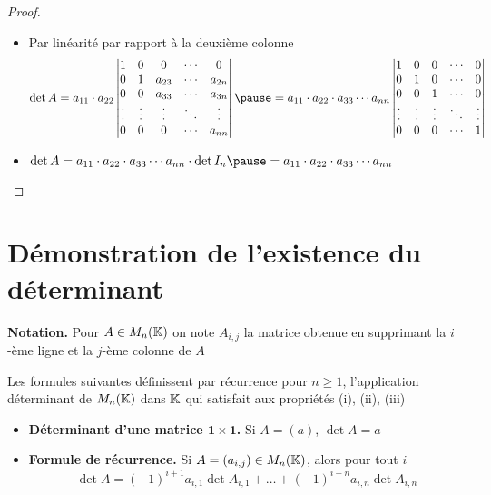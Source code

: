 \begin{frame}
\begin{proof}
\begin{itemize}
  \item Par linéarité par rapport à la deuxième colonne 
\[
\det A =a_{11} \cdot a_{22}\left|\begin{matrix}
1&0&0&\cdots&0\\
0&1&a_{23}&\cdots&a_{2n}\\
0&0&{a_{33}}&\cdots&a_{3n}\\
\vdots&\vdots&\vdots&\ddots&\vdots\\
0&0&0&\cdots&{a_{nn}}
\end{matrix}\right|
\pause=a_{11} \cdot a_{22} \cdot a_{33}\cdots{a_{nn}}\left|\begin{matrix}
1&0&0&\cdots&0\\
0&1&0&\cdots&0\\
0&0&1&\cdots&0\\
\vdots&\vdots&\vdots&\ddots&\vdots\\
0&0&0&\cdots&1
\end{matrix}\right| 
\]

  \item\pause  $\det A = a_{11} \cdot a_{22} \cdot a_{33}\cdots{a_{nn}} \cdot \det I_n \pause = a_{11} \cdot a_{22} \cdot a_{33}\cdots{a_{nn}}$

\end{itemize}
\end{proof} 
\end{frame}



\section{Démonstration de l'existence du déterminant}

\begin{frame}


\textbf{Notation.}
Pour $A \in M_n(\mathbb{K})$ \pause on note $A_{i,j}$ la matrice obtenue en supprimant la $i$-ème ligne et la $j$-ème colonne de $A$ 
 \pause

\begin{theoreme}
Les formules suivantes définissent par récurrence pour $n\ge 1$, l'application déterminant
de $M_n(\mathbb{K})$ dans $\mathbb{K}$ qui satisfait aux propriétés (i), (ii), (iii)
\smallskip

\begin{itemize}
  \item \pause \textbf{Déterminant d'une matrice $\mathbf{1\times 1}$.} 
  Si $A=(a)$, $\det A = a$
  
\smallskip  
  \item \pause \textbf{Formule de récurrence.} 
  Si $A=(a_{i,j}) \in M_n(\mathbb{K})$, alors pour tout $i$
$$\det A = (-1)^{i+1}a_{i,1}\det A_{i,1} +\dots 
+ (-1)^{i+n}a_{i,n}\det A_{i,n}$$  
\end{itemize}

\end{theoreme}

\end{frame}


